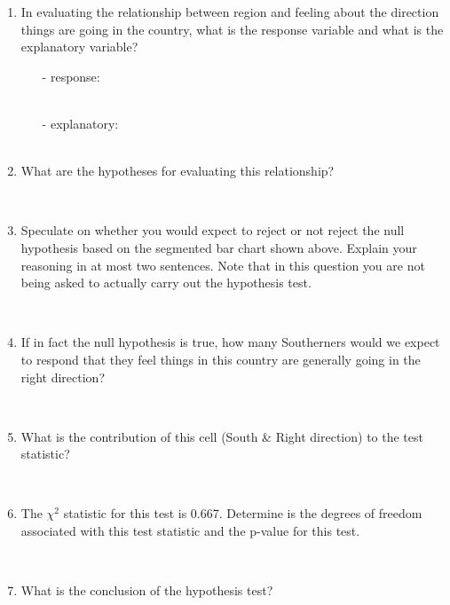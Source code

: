 \documentclass[11pt]{article}
\newcommand{\soln}[2]{$\:$\\ \vspace{#1}}{}
\begin{document}
\begin{enumerate}

\item In evaluating the relationship between region and feeling about the direction things 
are going in the country, what is the response variable and what is the explanatory variable?
\begin{itemize}
\item[-] response: \soln{0.2cm}{direction} \\
\item[-] explanatory: \soln{0.2cm}{region} \\
\end{itemize}

\item What are the hypotheses for evaluating this relationship?

\soln{3cm}{$H_0:$ Region and opinion on direction are independent. \\
$H_A:$ Region and opinion on direction are dependent. \\
}

\item Speculate on whether you would expect to reject or not reject the null hypothesis based on the 
segmented bar chart shown above. Explain your reasoning in at most two sentences. Note that in
this question you are not being asked to actually carry out the hypothesis test.

\soln{3cm}{No, \\
P(right direction $|$ each level of the region variable) is roughly equal, chances are we won't reject $H_0$.}

\item If in fact the null hypothesis is true, how many Southerners would we expect to respond that 
they feel things in this country are generally going in the right direction?

\soln{3cm}{$E = \frac{193 \times 171}{500} = 66.006$}

\item What is the contribution of this cell (South \& Right direction) to the test statistic?

\soln{3cm}{$\frac{(62 - 66.006)^2}{66.006} = 0.24313$}

\item The $\chi^2$ statistic for this test is 0.667. Determine is the degrees of freedom associated with this
test statistic and the p-value for this test.

\soln{3cm}{$df = (R - 1) \times (C - 1) = 3 \times 1 = 3$ \\
$p-value = 0.8809$ (or something around this if using the table)
}

\item What is the conclusion of the hypothesis test?

\soln{1cm}{Fail to reject $H_0$. The data do not provide convincing evidence for a relationship
between region and feeling about the direction things are going in the country.
}

\end{enumerate}
\end{document}
